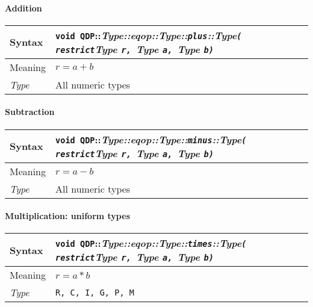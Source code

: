 \documentclass[12pt,letterpaper]{article}
\newcommand{\namespace}{QDP}
\newcommand{\allNumericTypes}{All numeric types}
\newcommand{\ttdash}{{::}}
\newcommand{\itt}{\it Type}
\newcommand{\extraarg}{}
\begin{document}
\paragraph{Addition}

\begin{flushleft}
  \begin{tabular}{|l|l|}
  \hline
  Syntax      & {\tt void \namespace}\ttdash\itt\ttdash{\it eqop}\ttdash\itt\ttdash{\tt plus}\ttdash\itt{\tt ( restrict}{\it Type }{\tt *r, }{\it Type }{\tt *a, }{\it Type }{\tt *b\extraarg)} \\
  \hline
  Meaning     & $r = a + b$ \\
  \hline
  \itt        & \allNumericTypes \\
  \hline
  \end{tabular}
\end{flushleft}

\paragraph{Subtraction}

\begin{flushleft}
  \begin{tabular}{|l|l|}
  \hline
  Syntax      & {\tt void \namespace}\ttdash\itt\ttdash{\it eqop}\ttdash\itt\ttdash{\tt minus}\ttdash\itt{\tt ( restrict}{\it Type }{\tt *r, }{\it Type }{\tt *a, }{\it Type }{\tt *b\extraarg)} \\
  \hline
  Meaning     & $r = a - b$ \\
  \hline
  \itt        & \allNumericTypes \\
  \hline
  \end{tabular}
\end{flushleft}

\paragraph{Multiplication: uniform types}

\begin{flushleft}
  \begin{tabular}{|l|l|}
  \hline
  Syntax      & {\tt void \namespace}\ttdash\itt\ttdash{\it eqop}\ttdash\itt\ttdash{\tt times}\ttdash\itt{\tt ( restrict}{\it Type }{\tt *r, }{\it Type }{\tt *a, }{\it Type }{\tt *b\extraarg)} \\
  \hline
  Meaning     & $r = a * b$ \\
  \hline
  \itt        & {\tt R, C, I, G, P, M} \\
  \hline
  \end{tabular}
\end{flushleft}
\end{document}
